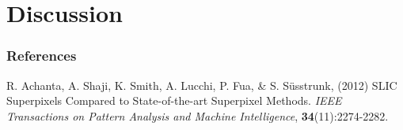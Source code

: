 \documentclass{article} %
\begin{document}
\section{Discussion}

\subsubsection*{References}

% 
% 

R. Achanta, A. Shaji, K. Smith, A. Lucchi, P. Fua, \& S. Süsstrunk, (2012) SLIC Superpixels Compared to State-of-the-art Superpixel Methods. {\it IEEE Transactions on Pattern Analysis and Machine Intelligence}, {\bf 34}(11):2274-2282.
\end{document}
